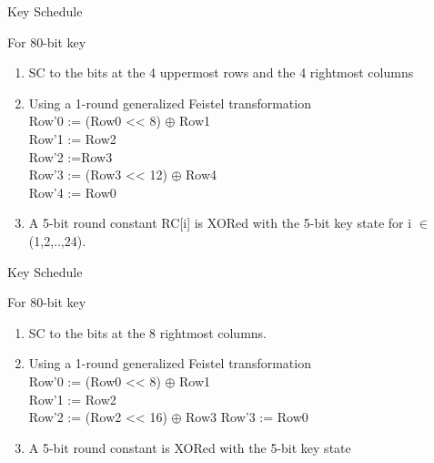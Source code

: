 \begin{frame}{Key Schedule}
    \begin{block}{For 80-bit key}
    \begin{enumerate}
        \item SC to the bits at the 4 uppermost rows and the 4 rightmost
columns
\item Using a 1-round generalized Feistel transformation\\
Row’0 := (Row0 << 8) $\oplus$ Row1\\
Row’1 := Row2\\
Row’2 :=Row3\\
Row’3 := (Row3 << 12) $\oplus$ Row4\\
Row’4 := Row0
\item A 5-bit round constant RC[i] is XORed with the 5-bit key
state for i $\in$ (1,2,..,24).
    \end{enumerate}
        
    \end{block}
    
\end{frame}
\begin{frame}{Key Schedule}
    \begin{block}{For 80-bit key}
    \begin{enumerate}
    \item SC to the bits at the 8 rightmost columns.
    \item Using a 1-round generalized Feistel transformation\\
    Row’0 := (Row0 << 8) $\oplus$ Row1\\
    Row’1 := Row2\\
    Row’2 := (Row2 << 16) $\oplus$ Row3 
    Row’3 := Row0
    \item A 5-bit round constant is XORed with the 5-bit key state
    \end{enumerate}
    \end{block}
\end{frame}

